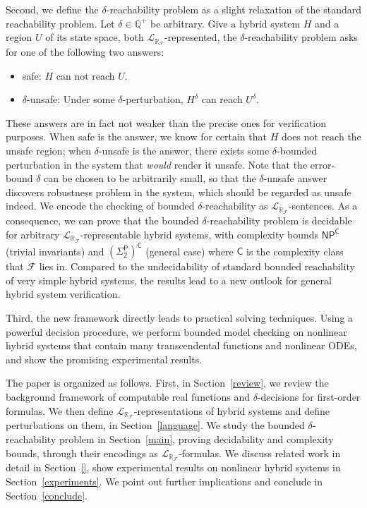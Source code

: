 \documentclass[envcountsect]{llncs}
\newcommand{\lrf}{\mathcal{L}_{\mathbb{R}_{\mathcal{F}}}}
\begin{document}
Second, we define the $\delta$-reachability problem as a slight
relaxation of the standard reachability problem. Let $\delta\in \mathbb{Q}^+$ be
arbitrary. Give a hybrid system $H$ and a region $U$ of its state
space, both $\lrf$-represented, the $\delta$-reachability problem asks for
one of the following two answers:
\begin{itemize}
 \item {\sf safe}: $H$ can not reach $U$.
 \item {\sf $\delta$-unsafe}: Under some $\delta$-perturbation, $H^{\delta}$ can
reach $U^{\delta}$. 
\end{itemize}
These answers are in fact not weaker than the precise ones for
verification purposes. When {\sf safe} is the answer, we know for certain
that $H$ does not reach the unsafe region; when {\sf $\delta$-unsafe} is the
answer, there exists some $\delta$-bounded perturbation in the
system that {\em would} render it unsafe. Note that the error-bound $\delta$ can
be chosen to be arbitrarily small, so that the {\sf$\delta$-unsafe} answer
discovers robustness problem in the system, which should be regarded as unsafe
indeed. We encode the checking of bounded $\delta$-reachability as
$\lrf$-sentences. As a consequence, we can prove that the bounded
$\delta$-reachability problem is decidable for arbitrary
$\lrf$-representable hybrid systems, with complexity bounds $\mathsf{NP^C}$
(trivial invariants) and $\mathsf{(\Sigma_2^P)^C}$ (general case) where
$\mathsf{C}$ is the complexity class that $\mathcal{F}$ lies in. Compared to the
 undecidability of standard bounded reachability of very simple hybrid systems,
the results lead to a new outlook for general hybrid system
verification. 

Third, the new framework directly leads to practical solving techniques. Using a
powerful decision procedure, we perform bounded model checking on nonlinear
hybrid systems that contain many transcendental
functions and nonlinear ODEs, and show the promising experimental results. 

The paper is organized as follows. First, in
Section~\ref{review}, we review the background framework of
computable real functions and $\delta$-decisions for first-order formulas. We
then define $\lrf$-representations of hybrid systems and define perturbations
on them, in Section~\ref{language}. We
study the bounded $\delta$-reachability problem in
Section~\ref{main}, proving decidability and complexity bounds, through their
encodings as $\lrf$-formulas. We discuss related work in detail in
Section~\ref{}, show experimental results on nonlinear hybrid systems
in Section~\ref{experiments}. We point out further implications and conclude in
Section~\ref{conclude}.
\end{document}
